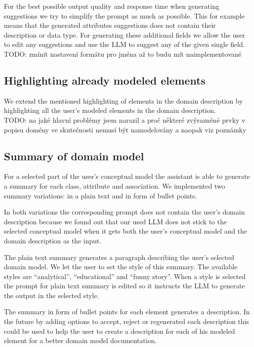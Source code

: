 For the best possible output quality and response time when generating suggestions we try to simplify the prompt as much as possible. This for example means that the generated attributes suggestions does not contain their description or data type. For generating these additional fields we allow the user to edit any suggestions and use the LLM to suggest any of the given single field. \\

TODO: zmínit nastavení formátu pro jména až to budu mít naimplementované \\


\subsection{Highlighting already modeled elements}

We extend the mentioned highlighting of elements in the domain description by highlighting all the user's modeled elements in the domain description. \\

TODO: na jaké hlavní problémy jsem narazil a proč některé zvýrazněné prvky v popisu domény ve skutečnosti nemusí být namodelovány a naopak viz poznámky \\


\subsection{Summary of domain model}

For a selected part of the user's conceptual model the assistant is able to generate a summary for each class, attribute and association. We implemented two summary variations: in a plain text and in form of bullet points.

In both variations the corresponding prompt does not contain the user's domain description because we found out that our used LLM does not stick to the selected conceptual model when it gets both the user's conceptual model and the domain description as the input.

The plain text summary generates a paragraph describing the user's selected domain model. We let the user to set the style of this summary. The available styles are ``analytical'', ``educational'' and ``funny story''. When a style is selected the prompt for plain text summary is edited so it instructs the LLM to generate the output in the selected style.

The summary in form of bullet points for each element generates a description. In the future by adding options to accept, reject or regenerated each description this could be used to help the user to create a description for each of his modeled element for a better domain model documentation.


